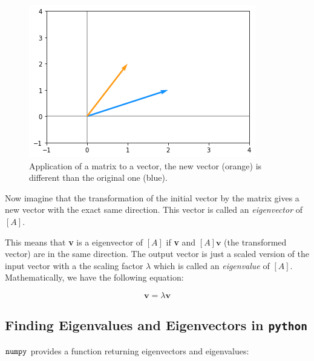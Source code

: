 \begin{figure}[htb]
	\centering
	\includegraphics[width=0.7\linewidth]{figures/matrix_transformation}
	\caption{Application of a matrix to a vector, the new vector (orange) is different than the original one (blue).}
	\label{fig:matrix_as_transform}
\end{figure}



Now imagine that the transformation of the initial vector by the matrix
gives a new vector with the exact same direction. This vector is called
an \emph{eigenvector} of \([A]\).

This means that \textbf{v} is a eigenvector of \([A]\) if \textbf{v} and \([A]\mathbf{v}\)
(the transformed vector) are in the same direction. The output vector is
just a scaled version of the input vector with a the scaling factor
\(\lambda\) which is called an \emph{eigenvalue} of \([A]\).
Mathematically, we have the following equation:

\begin{equation}
[A]\mathbf{v}=\lambda \mathbf{v}
\end{equation}

\subsection{Finding Eigenvalues and Eigenvectors in \texttt{python}}
\label{find-eigenvalues-and-eigenvectors-in-python}

\(\tt{numpy}\) provides a function returning eigenvectors and
eigenvalues: 


